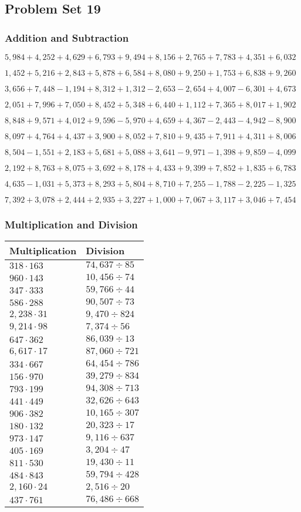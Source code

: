 \hypertarget{problem-set-19-3}{%
\subsection{Problem Set 19}\label{problem-set-19-3}}

\hypertarget{addition-and-subtraction-181}{%
\subsubsection{Addition and
Subtraction}\label{addition-and-subtraction-181}}

\(5,984+4,252+4,629+6,793+9,494+8,156+2,765+7,783+4,351+ 6,032\)

\(1,452+5,216+2,843+5,878+6,584+8,080+9,250+1,753+6,838+9,260\)

\(3,656+7,448-1,194+8,312+1,312-2,653-2,654+4,007-6,301+4,673\)

\(2,051+7,996+7,050+8,452+5,348+6,440+1,112+7,365+8,017+1,902\)

\(8,848+9,571+4,012+9,596-5,970+4,659+4,367-2,443-4,942-8,900\)

\(8,097+4,764+4,437+3,900+8,052+7,810+9,435+7,911+4,311+8,006\)

\(8,504-1,551+2,183+5,681+5,088+3,641-9,971-1,398+9,859-4,099\)

\(2,192+8,763+8,075+3,692+8,178+4,433+9,399+7,852+1,835+6,783\)

\(4,635-1,031+5,373+8,293+5,804+8,710+7,255-1,788-2,225-1,325\)

\(7,392+3,078+2,444+2,935+3,227+1,000+7,067+3,117+3,046+7,454\)

\hypertarget{multiplication-and-division-180}{%
\subsubsection{Multiplication and
Division}\label{multiplication-and-division-180}}

\begin{longtable}[]{@{}ll@{}}
\toprule
Multiplication & Division\tabularnewline
\midrule
\endhead
\(318\cdot163\) & \(74,637÷85\)\tabularnewline
\(960\cdot143\) & \(10,456÷74\)\tabularnewline
\(347\cdot333\) & \(59,766÷44\)\tabularnewline
\(586\cdot288\) & \(90,507÷73\)\tabularnewline
\(2,238\cdot31\) & \(9,470÷824\)\tabularnewline
\(9,214\cdot98\) & \(7,374÷56\)\tabularnewline
\(647\cdot362\) & \(86,039÷13\)\tabularnewline
\(6,617\cdot17\) & \(87,060÷721\)\tabularnewline
\(334\cdot667\) & \(64,454÷786\)\tabularnewline
\(156\cdot970\) & \(39,279÷834\)\tabularnewline
\(793\cdot199\) & \(94,308÷713\)\tabularnewline
\(441\cdot449\) & \(32,626÷643\)\tabularnewline
\(906\cdot382\) & \(10,165÷307\)\tabularnewline
\(180\cdot132\) & \(20,323÷17\)\tabularnewline
\(973\cdot147\) & \(9,116÷637\)\tabularnewline
\(405\cdot169\) & \(3,204÷47\)\tabularnewline
\(811\cdot530\) & \(19,430÷11\)\tabularnewline
\(484\cdot843\) & \(59,794÷428\)\tabularnewline
\(2,160\cdot24\) & \(2,516÷20\)\tabularnewline
\(437\cdot761\) & \(76,486÷668\)\tabularnewline
\bottomrule
\end{longtable}

